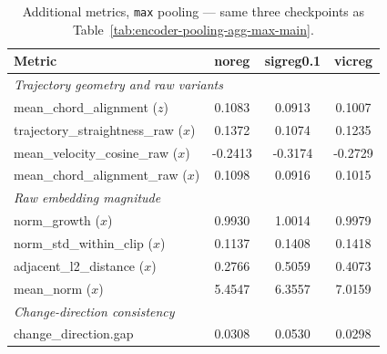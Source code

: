\begin{table}[H]
\centering
\caption{Additional metrics, \texttt{max} pooling --- same three checkpoints as
Table~\ref{tab:encoder-pooling-agg-max-main}.}
\label{tab:encoder-pooling-agg-max-additional}
\begin{tabular}{lccc}
\toprule
Metric & noreg & sigreg0.1 & vicreg \\
\midrule
\multicolumn{4}{l}{\textit{Trajectory geometry and raw variants}} \\
mean\_chord\_alignment ($z$) & 0.1083 & 0.0913 & 0.1007 \\
trajectory\_straightness\_raw ($x$) & 0.1372 & 0.1074 & 0.1235 \\
mean\_velocity\_cosine\_raw ($x$) & -0.2413 & -0.3174 & -0.2729 \\
mean\_chord\_alignment\_raw ($x$) & 0.1098 & 0.0916 & 0.1015 \\
\midrule
\multicolumn{4}{l}{\textit{Raw embedding magnitude}} \\
norm\_growth ($x$) & 0.9930 & 1.0014 & 0.9979 \\
norm\_std\_within\_clip ($x$) & 0.1137 & 0.1408 & 0.1418 \\
adjacent\_l2\_distance ($x$) & 0.2766 & 0.5059 & 0.4073 \\
mean\_norm ($x$) & 5.4547 & 6.3557 & 7.0159 \\
\midrule
\multicolumn{4}{l}{\textit{Change-direction consistency}} \\
change\_direction.gap & 0.0308 & 0.0530 & 0.0298 \\
\bottomrule
\end{tabular}
\end{table}

